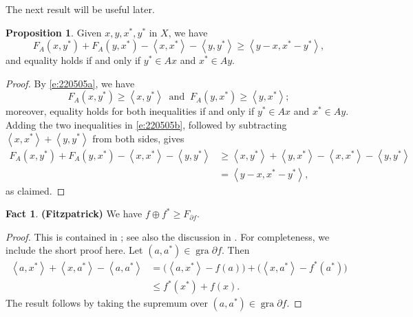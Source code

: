 \documentclass[12pt]{article}
\newcommand{\scal}[2]{\left\langle{#1},{#2}  \right\rangle}
\theoremstyle{definition}
\newtheorem{proposition}[theorem]{Proposition}
\newtheorem{fact}[theorem]{Fact}
\providecommand{\gr}{\operatorname{gra}}
\providecommand{\gr}{\operatorname{gra}}
\begin{document}
{The next result will be useful later. 
\begin{proposition}
\label{p:pre}
Given $x,y,x^*,y^*$ in $X$, we have 
\begin{equation}
F_A(x,y^*)+F_A(y,x^*)-\scal{x}{x^*}-\scal{y}{y^*} 
\geq \scal{y-x}{x^*-y^*},
\end{equation}
and equality holds if and only if $y^*\in Ax$ and $x^*\in Ay$. 
\end{proposition}
\begin{proof}
By \cref{e:220505a}, we have 
\begin{equation}
\label{e:220505b}
F_A(x,y^*) \geq \scal{x}{y^*}
\;\;\text{and}\;\;
F_A(y,x^*) \geq \scal{y}{x^*};
\end{equation}
moreover, equality holds for both inequalities if and only if 
$y^*\in Ax$ and $x^*\in Ay$. 
Adding the two inequalities in \cref{e:220505b}, followed by 
subtracting $\scal{x}{x^*}+\scal{y}{y^*}$ from both sides, gives
\begin{subequations}
\begin{align}
F_A(x,y^*)+F_A(y,x^*)-\scal{x}{x^*}-\scal{y}{y^*}
&\geq \scal{x}{y^*} + \scal{y}{x^*} - \scal{x}{x^*}-\scal{y}{y^*}\\
&= \scal{y-x}{x^*-y^*},
\end{align}
\end{subequations}
as claimed. 
\end{proof}

\begin{fact} {\bf (Fitzpatrick)}
\label{f:Fsub}
We have 
$f\oplus f^* \geq F_{\partial f}$. 
\end{fact}
\begin{proof}
This is contained in \cite{SF}; see also the discussion in 
\cite[Section~2]{BMS}. For completeness, we include the short proof here. 
Let $(a,a^*)\in\gr \partial f$. 
Then 
\begin{subequations}
\begin{align}
\scal{a}{x^*}+\scal{x}{a^*}-\scal{a}{a^*}
&= \big(\scal{a}{x^*}-f(a)\big) +\big(\scal{x}{a^*}-f^*(a^*)\big)\\
&\leq f^*(x^*) + f(x). 
\end{align}
\end{subequations}
The result follows by taking the supremum over $(a,a^*)\in\gr \partial f$. 
\end{proof}



}
\end{document}
